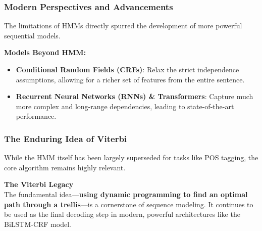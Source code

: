 \documentclass[aspectratio=43, 9pt]{beamer}
\begin{document}
\begin{frame}
    \frametitle{Modern Perspectives and Advancements}
    The limitations of HMMs directly spurred the development of more powerful sequential models.
    
    \vspace{1em}
    
    \textbf{Models Beyond HMM:}
        \begin{itemize}
            \item \textbf{Conditional Random Fields (CRFs)}: Relax the strict independence assumptions, allowing for a richer set of features from the entire sentence.
            \item \textbf{Recurrent Neural Networks (RNNs) \& Transformers}: Capture much more complex and long-range dependencies, leading to state-of-the-art performance.
        \end{itemize}
\end{frame}

\begin{frame}
    \frametitle{The Enduring Idea of Viterbi}
    While the HMM itself has been largely superseded for tasks like POS tagging, the core algorithm remains highly relevant.
    
    \vspace{1em}
    
    \begin{Takeaway}
        \textbf{The Viterbi Legacy} \\
        The fundamental idea—\textbf{using dynamic programming to find an optimal path through a trellis}—is a cornerstone of sequence modeling. It continues to be used as the final decoding step in modern, powerful architectures like the BiLSTM-CRF model.
    \end{Takeaway}
\end{frame}
\end{document}
